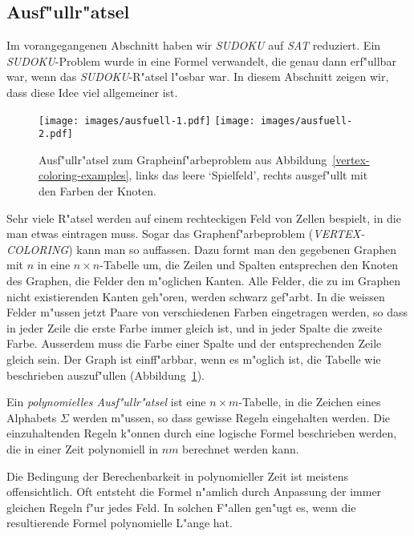 \subsection{Ausf"ullr"atsel}
Im vorangegangenen Abschnitt haben wir \textsl{SUDOKU} auf \textsl{SAT}
reduziert.
Ein \textsl{SUDOKU}-Problem wurde in eine Formel verwandelt, die genau
dann erf"ullbar war, wenn das \textsl{SUDOKU}-R"atsel l"osbar war.
In diesem Abschnitt zeigen wir, dass diese Idee viel allgemeiner ist.

\begin{figure}
\centering
\texttt{[image: images/ausfuell-1.pdf]}
\qquad
\qquad
\texttt{[image: images/ausfuell-2.pdf]}
\caption{Ausf"ullr"atsel zum Grapheinf"arbeproblem aus
Abbildung~\ref{vertex-coloring-examples}, links das leere `Spielfeld',
rechts ausgef"ullt mit den Farben der Knoten.
\label{ausfuell:coloring}}
\end{figure}
Sehr viele R"atsel werden auf einem rechteckigen Feld von Zellen
bespielt, in die man etwas eintragen muss.
Sogar das Graphenf"arbeproblem (\textsl{VERTEX-COLORING}) kann man
so auffassen.
Dazu formt man den gegebenen Graphen mit $n$ in eine
$n\times n$-Tabelle um, die Zeilen und Spalten entsprechen den Knoten
des Graphen, die Felder den m"oglichen Kanten.
Alle Felder, die zu im Graphen nicht existierenden Kanten geh"oren,
werden schwarz gef"arbt.
In die weissen Felder m"ussen jetzt Paare von verschiedenen Farben
eingetragen werden, so dass in jeder Zeile die erste Farbe immer
gleich ist, und in jeder Spalte die zweite Farbe.
Ausserdem muss die Farbe einer Spalte und der entsprechenden Zeile
gleich sein.
Der Graph ist einff"arbbar, wenn es m"oglich ist, die Tabelle wie
beschrieben auszuf"ullen (Abbildung~\ref{ausfuell:coloring}).

\begin{definition}
Ein {\em polynomielles Ausf"ullr"atsel} ist eine $n\times m$-Tabelle,
in die Zeichen eines Alphabets $\Sigma$ werden m"ussen, so dass gewisse
Regeln eingehalten werden. 
Die einzuhaltenden Regeln k"onnen durch eine logische Formel beschrieben
werden, die in einer Zeit polynomiell in $nm$ berechnet werden kann.
\end{definition}

Die Bedingung der Berechenbarkeit in polynomieller Zeit ist meistens
offensichtlich.
Oft entsteht die Formel n"amlich durch Anpassung der immer gleichen
Regeln f"ur jedes Feld.
In solchen F"allen gen"ugt es, wenn die resultierende Formel polynomielle
L"ange hat.

